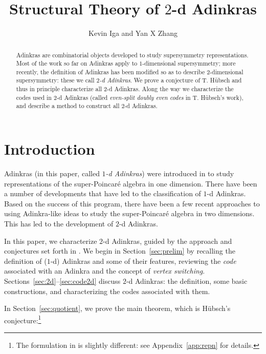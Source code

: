 \documentclass[12pt,twoside,singlespace]{article}
\title{Structural Theory of $2$-d Adinkras}
\author{Kevin Iga and Yan X Zhang}
\numberwithin{equation}{section}
\theoremstyle{definition}
\begin{document}
\pagestyle{plain}

\maketitle

\begin{abstract}
Adinkras are combinatorial objects developed to study supersymmetry representations. Most of the work so far on Adinkras apply to $1$-dimensional supersymmetry; more recently, the definition of Adinkras has been modified so as to describe $2$-dimensional supersymmetry: these we call \emph{$2$-d Adinkras}.  We prove a conjecture of T. H\"ubsch and thus in principle characterize all $2$-d Adinkras.  Along the way we characterize the codes used in $2$-d Adinkras (called \emph{even-split doubly even codes} in T. H\"ubsch's work), and describe a method to construct all $2$-d Adinkras.
\end{abstract}


\section{Introduction}
Adinkras (in this paper, called \emph{$1$-d Adinkras}) were introduced in \cite{d2l:first} to study representations of the super-Poincar\'e algebra in one dimension.  There have been a number of developments that have led to the classification of $1$-d Adinkras.\cite{d2l:graph-theoretic,d2l:omni,d2l:topology,zhang:adinkras,dil:cohomology,d2l:decodes}  Based on the success of this program, there have been a few recent approaches to using Adinkra-like ideas to study the super-Poincar\'e algebra in two dimensions.  This has led to the development of $2$-d Adinkras.\cite{gates:dimensional_extension,hubsch:weaving}

In this paper, we characterize $2$-d Adinkras, guided by the approach and conjectures set forth in \cite{hubsch:weaving}. We begin in Section~\ref{sec:prelim} by recalling the definition of ($1$-d) Adinkras and some of their features, reviewing the \emph{code} associated with an Adinkra\cite{d2l:omni} and the concept of \emph{vertex switching}.\cite{zhang:adinkras,dil:cohomology}  Sections~\ref{sec:2d}--\ref{sec:code2d} discuss $2$-d Adinkras: the definition, some basic constructions, and characterizing the codes associated with them.

In Section~\ref{sec:quotient}, we prove the main theorem, which is H\"ubsch's conjecture:\footnote{The formulation in \cite{hubsch:weaving} is slightly different: see Appendix~\ref{app:repn} for details.}
\end{document}
